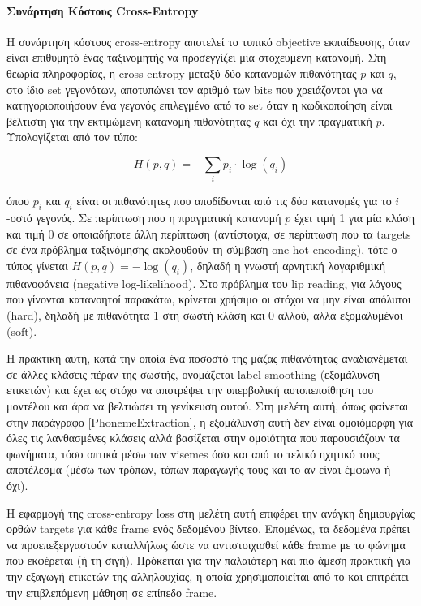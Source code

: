 \paragraph{Συνάρτηση Κόστους Cross-Entropy}

Η συνάρτηση κόστους cross-entropy αποτελεί το τυπικό objective εκπαίδευσης, όταν είναι επιθυμητό ένας ταξινομητής να προσεγγίζει μία στοχευμένη κατανομή. Στη θεωρία πληροφορίας, η cross-entropy μεταξύ δύο κατανομών πιθανότητας $p$ και $q$, στο ίδιο set γεγονότων, αποτυπώνει τον αριθμό των bits που χρειάζονται για να κατηγοριοποιήσουν ένα γεγονός επιλεγμένο από το set όταν η κωδικοποίηση είναι βέλτιστη για την εκτιμώμενη κατανομή πιθανότητας $q$ και όχι την πραγματική $p$. Υπολογίζεται από τον τύπο:

\[
H(p,q) = - \sum_{i}p_i \cdot \log(q_i)
\]

όπου $p_i$ και $q_i$ είναι οι πιθανότητες που αποδίδονται από τις δύο κατανομές για το $i$-οστό γεγονός. Σε περίπτωση που η πραγματική κατανομή $p$ έχει τιμή 1 για μία κλάση και τιμή 0 σε οποιαδήποτε άλλη περίπτωση (αντίστοιχα, σε περίπτωση που τα targets σε ένα πρόβλημα ταξινόμησης ακολουθούν τη σύμβαση one-hot encoding), τότε ο τύπος γίνεται $H(p,q) = -\log(q_i)$, δηλαδή η γνωστή αρνητική λογαριθμική πιθανοφάνεια (negative log-likelihood). Στο πρόβλημα του lip reading, για λόγους που γίνονται κατανοητοί παρακάτω, κρίνεται χρήσιμο οι στόχοι να μην είναι απόλυτοι (hard), δηλαδή με πιθανότητα 1 στη σωστή κλάση και 0 αλλού, αλλά εξομαλυμένοι (soft).

Η πρακτική αυτή, κατά την οποία ένα ποσοστό της μάζας πιθανότητας αναδιανέμεται σε άλλες κλάσεις πέραν της σωστής, ονομάζεται label smoothing (εξομάλυνση ετικετών) και έχει ως στόχο να αποτρέψει την υπερβολική αυτοπεποίθηση του μοντέλου και άρα να βελτιώσει τη γενίκευση αυτού. Στη μελέτη αυτή, όπως φαίνεται στην παράγραφο \ref{PhonemeExtraction}, η εξομάλυνση αυτή δεν είναι ομοιόμορφη για όλες τις λανθασμένες κλάσεις αλλά βασίζεται στην ομοιότητα που παρουσιάζουν τα φωνήματα, τόσο οπτικά μέσω των visemes όσο και από το τελικό ηχητικό τους αποτέλεσμα (μέσω των τρόπων, τόπων παραγωγής τους και το αν είναι έμφωνα ή όχι).

Η εφαρμογή της cross-entropy loss στη μελέτη αυτή επιφέρει την ανάγκη δημιουργίας ορθών targets για κάθε frame ενός δεδομένου βίντεο. Επομένως, τα δεδομένα πρέπει να προεπεξεργαστούν καταλλήλως ώστε να αντιστοιχισθεί κάθε frame με το φώνημα που εκφέρεται (ή τη σιγή). Πρόκειται για την παλαιότερη και πιο άμεση πρακτική για την εξαγωγή ετικετών της αλληλουχίας, η οποία χρησιμοποιείται από το \cite{GRAVES2005602} και επιτρέπει την επιβλεπόμενη μάθηση σε επίπεδο frame.

